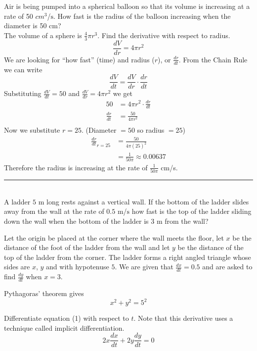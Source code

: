 \examq Air is being pumped into a spherical balloon so that its volume is increasing at a rate of 50 $cm^{3}$/$\mbox{s}$. How fast is the radius of the balloon increasing when the diameter is 50 $\mbox{cm}$? \\
\solution The volume of a sphere is $\frac{4}{3}\pi r^3$. Find the derivative with respect to radius.
\[\frac{d V}{d r} =4 \pi r^2\]
We are looking for ``how fast'' (time) and radius ($r$), or $\frac{dr}{dt}$. From the Chain Rule we can write
\[\frac{d V}{d t} =\frac{d V}{d r} \cdot \frac{d r}{d t}\]
Substituting $\frac{d V}{d t} =50$ and $\frac{d V}{d r} =4 \pi  r^{2}$ we get
\begin{align*}50 &  = 4 \pi  r^{2} \cdot \frac{d r}{d t} \\
\frac{d r}{d t} &  = \frac{50}{4 \pi  r^{2}} \\
\end{align*}
Now we substitute $r =25$. (Diameter $ =50$ so radius $ =25$)
\begin{align*}\frac{d r}{d t}_{r =25} &  = \frac{50}{4\pi(25)^2} \\
&  = \frac{1}{50 \pi }\approx 0.00637\end{align*}
Therefore the radius is increasing at the rate of $\displaystyle\frac{1}{50 \pi }$ cm/s.\\
\rule{6.8cm}{0.5pt}\\
\example A ladder $5$ $\mbox{m}$ long rests against a vertical wall. If the bottom of the ladder slides away from the wall at the rate of $0.5$ $\mbox{m}$/$\mbox{s}$ how fast is the top of the ladder sliding down the wall when the bottom of the ladder is $3$ $\mbox{m}$ from the wall?

\solution Let the origin be placed at the corner where the wall meets the floor, let $x$ be the distance of the foot of the ladder from the wall and let $y$ be the distance of the top of the ladder from the corner. The ladder forms a right angled triangle whose sides are $x$, $y$ and with hypotenuse $5$. We are given that $\frac{d x}{d t} =0.5$ and are asked to find $\frac{d y}{d t}$ when $x =3$.

Pythagoras' theorem gives
\begin{equation}x^{2} +y^{2} =5^{2}\tag{1}
\end{equation}

Differentiate equation (1) with respect to $t$. Note that this derivative uses a technique called implicit differentiation.
\begin{equation*}2 x \frac{d x}{d t} +2 y \frac{d y}{d t} =0
\end{equation*}

